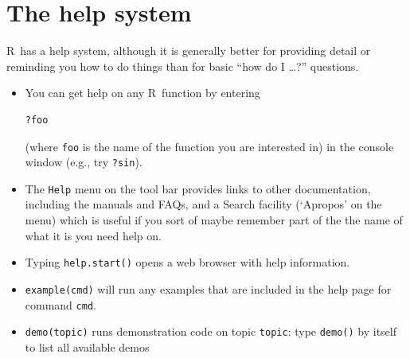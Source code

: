 \documentclass[11pt]{article}\usepackage[]{graphicx}\usepackage[]{color}
\newcommand{\code}[1]{{\tt #1}}
\newcommand\R{{\sf R}}
\numberwithin{exercise}{section}
\begin{document}
\section{The help system}

\R\ has a help system, although it is generally
better for providing detail or reminding you how to do things than
for basic ``how do I \ldots?'' questions.

\begin{itemize}
\item You can get help on any \R\ function by entering
\begin{verbatim}
?foo
\end{verbatim} 
(where \code{foo} is the name of the function
you are interested in)
in the console window (e.g., try \code{?sin}). 
\item The \code{Help} menu on the tool bar
provides links to other documentation,
including the manuals and FAQs, and a 
Search facility (`Apropos' on the menu)
which is useful if you sort of maybe remember part of the
the name of what it is you need help on.
\item Typing \code{help.start()}
opens a web browser with help information.
\item \code{example(cmd)} will run any examples that are included
in the help page for command \code{cmd}.
\item{\code{demo(topic)} runs demonstration code on topic \code{topic}: type
\code{demo()} by itself to list all available demos}
\end{itemize}
\end{document}
